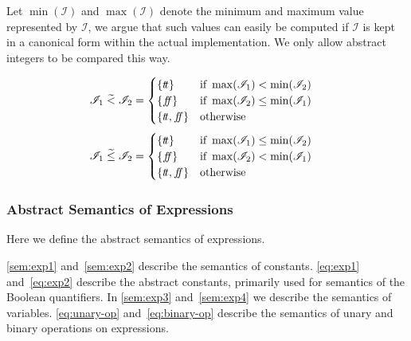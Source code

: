 Let $\min(\mathscr{I})$ and $\max(\mathscr{I})$ denote the minimum and maximum value represented by $\mathscr{I}$, we argue that such values can easily be computed if $\mathscr{I}$ is kept in a canonical form within the actual implementation.
We only allow abstract integers to be compared this way.

\begin{align}\label{eq:aaabcomp2}
    \mathscr{I}_1 \;\aab{<}\; \mathscr{I}_2 &= \begin{cases}
        \{\true\} & \text{if } \max(\mathscr{I}_1) < \min(\mathscr{I}_2) \\
        \{\false\} & \text{if } \max(\mathscr{I}_2) \leq \min (\mathscr{I}_1) \\
        \{\true, \false\} & \text{otherwise}
    \end{cases}
\end{align}
\begin{align}\label{eq:aaabcomp3}
    \mathscr{I}_1 \;\aab{\leq}\; \mathscr{I}_2 &= \begin{cases}
        \{\true\} & \text{if } \max(\mathscr{I}_1) \leq \min(\mathscr{I}_2) \\
        \{\false\} & \text{if } \max(\mathscr{I}_2) < \min (\mathscr{I}_1) \\
        \{\true, \false\} & \text{otherwise}
    \end{cases}
\end{align}

\subsubsection{Abstract Semantics of Expressions}
Here we define the abstract semantics of expressions.

\autoref{sem:exp1} and~\ref{sem:exp2} describe the semantics of constants.
\autoref{eq:exp1} and~\ref{eq:exp2} describe the abstract constants, primarily used for semantics of the Boolean quantifiers.
In \autoref{sem:exp3} and~\ref{sem:exp4} we describe the semantics of variables.
\autoref{eq:unary-op} and~\ref{eq:binary-op} describe the semantics of unary and binary operations on expressions.


